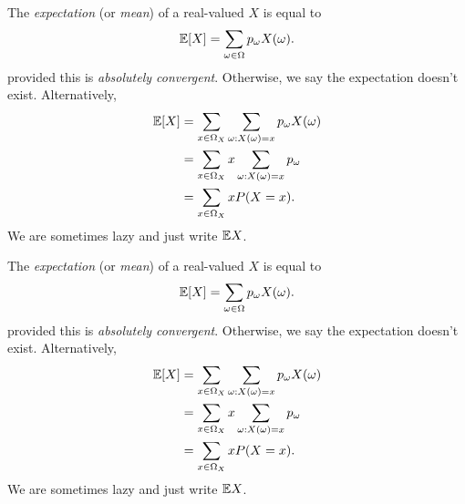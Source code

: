 \begin{note}
  \begin{field}
    \begin{defi}[Expectation]
      The \emph{expectation} (or \emph{mean}) of a real-valued $X$ is equal to
      \[
        \mathbb{E}[X] = \sum_{\omega\in \Omega}p_\omega X(\omega).
      \]
      provided this is \emph{absolutely convergent}. Otherwise, we say the expectation doesn't exist. Alternatively,
      \begin{align*}
        \mathbb{E}[X] &= \sum_{x\in \Omega_X}\sum_{\omega: X(\omega) = x}p_\omega X(\omega)\\
        &= \sum_{x\in \Omega_X}x\sum_{\omega:X(\omega) = x}p_\omega\\
        &= \sum_{x\in \Omega_X}xP(X = x).
      \end{align*}
      We are sometimes lazy and just write $\mathbb{E} X$.
    \end{defi}
  \end{field}
  \begin{field}
    \begin{defi}[Expectation]
      The \emph{expectation} (or \emph{mean}) of a real-valued $X$ is equal to
      \[
        \mathbb{E}[X] = \sum_{\omega\in \Omega}p_\omega X(\omega).
      \]
      provided this is \emph{absolutely convergent}. Otherwise, we say the expectation doesn't exist. Alternatively,
      \begin{align*}
        \mathbb{E}[X] &= \sum_{x\in \Omega_X}\sum_{\omega: X(\omega) = x}p_\omega X(\omega)\\
        &= \sum_{x\in \Omega_X}x\sum_{\omega:X(\omega) = x}p_\omega\\
        &= \sum_{x\in \Omega_X}xP(X = x).
      \end{align*}
      We are sometimes lazy and just write $\mathbb{E} X$.
    \end{defi}
  \end{field}
  \xplain{}%
\end{note}

